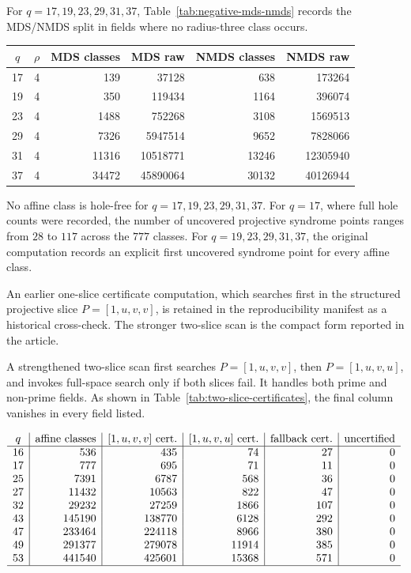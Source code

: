 ﻿\documentclass[11pt]{article}
\theoremstyle{plain}
\theoremstyle{definition}
\begin{document}
For \(q=17,19,23,29,31,37\), Table~\ref{tab:negative-mds-nmds} records the
MDS/NMDS split in fields where no radius-three class occurs.
\begin{center}
\label{tab:negative-mds-nmds}
\small
\begin{tabular}{c c r r r r}
\toprule
\(q\)&\(\rho\)&MDS classes&MDS raw&NMDS classes&NMDS raw\\
\midrule
17&4&139   &37128    &638   &173264\\
19&4&350   &119434   &1164  &396074\\
23&4&1488  &752268   &3108  &1569513\\
29&4&7326  &5947514  &9652  &7828066\\
31&4&11316 &10518771 &13246 &12305940\\
37&4&34472 &45890064 &30132 &40126944\\
\bottomrule
\end{tabular}
\end{center}
No affine class is hole-free for \(q=17,19,23,29,31,37\).  For \(q=17\),
where full
hole counts were recorded, the number of uncovered projective syndrome points
ranges from \(28\) to \(117\) across the \(777\) classes.  For \(q=19,23,29,31,37\),
the original computation records an explicit first uncovered syndrome point
for every affine class.

An earlier one-slice certificate computation, which searches first in the
structured projective slice \(P=[1,u,v,v]\), is retained in the
reproducibility manifest as a historical cross-check.  The stronger
two-slice scan is the compact form reported in the article.

A strengthened two-slice scan first searches \(P=[1,u,v,v]\), then
\(P=[1,u,v,u]\), and invokes full-space search only if both slices fail.
It handles both prime and non-prime fields.  As shown in
Table~\ref{tab:two-slice-certificates}, the final column vanishes in every
field listed.
\begin{center}
\label{tab:two-slice-certificates}
\(
\begin{array}{c|r|r|r|r|r}
q & \hbox{affine classes} & [1,u,v,v]\hbox{ cert.}
  & [1,u,v,u]\hbox{ cert.} & \hbox{fallback cert.} & \hbox{uncertified}\\
\hline
16 & 536    & 435    & 74    & 27  & 0\\
17 & 777    & 695    & 71    & 11  & 0\\
25 & 7391   & 6787   & 568   & 36  & 0\\
27 & 11432  & 10563  & 822   & 47  & 0\\
32 & 29232  & 27259  & 1866  & 107 & 0\\
43 & 145190 & 138770 & 6128  & 292 & 0\\
47 & 233464 & 224118 & 8966  & 380 & 0\\
49 & 291377 & 279078 & 11914 & 385 & 0\\
53 & 441540 & 425601 & 15368 & 571 & 0\\
\hline
\end{array}
\)
\end{center}
\end{document}
